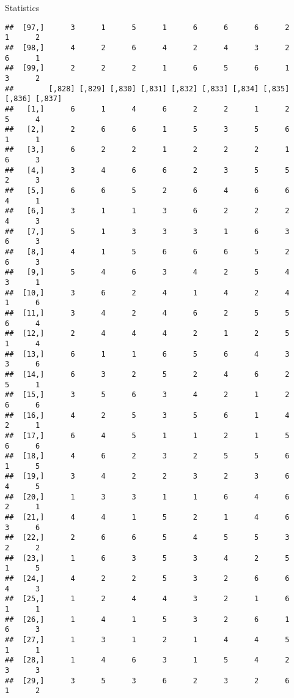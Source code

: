 \documentclass[
  ignorenonframetext,
]{beamer}
\begin{document}
\begin{frame}[fragile]{Statistics}
\begin{verbatim}
##  [97,]      3      1      5      1      6      6      6      2      1      2
##  [98,]      4      2      6      4      2      4      3      2      6      1
##  [99,]      2      2      2      1      6      5      6      1      3      2
##        [,828] [,829] [,830] [,831] [,832] [,833] [,834] [,835] [,836] [,837]
##   [1,]      6      1      4      6      2      2      1      2      5      4
##   [2,]      2      6      6      1      5      3      5      6      1      1
##   [3,]      6      2      2      1      2      2      2      1      6      3
##   [4,]      3      4      6      6      2      3      5      5      2      3
##   [5,]      6      6      5      2      6      4      6      6      4      1
##   [6,]      3      1      1      3      6      2      2      2      4      3
##   [7,]      5      1      3      3      3      1      6      3      6      3
##   [8,]      4      1      5      6      6      6      5      2      6      3
##   [9,]      5      4      6      3      4      2      5      4      3      1
##  [10,]      3      6      2      4      1      4      2      4      1      6
##  [11,]      3      4      2      4      6      2      5      5      6      4
##  [12,]      2      4      4      4      2      1      2      5      1      4
##  [13,]      6      1      1      6      5      6      4      3      3      6
##  [14,]      6      3      2      5      2      4      6      2      5      1
##  [15,]      3      5      6      3      4      2      1      2      6      6
##  [16,]      4      2      5      3      5      6      1      4      2      1
##  [17,]      6      4      5      1      1      2      1      5      6      6
##  [18,]      4      6      2      3      2      5      5      6      1      5
##  [19,]      3      4      2      2      3      2      3      6      4      5
##  [20,]      1      3      3      1      1      6      4      6      2      1
##  [21,]      4      4      1      5      2      1      4      6      3      6
##  [22,]      2      6      6      5      4      5      5      3      2      2
##  [23,]      1      6      3      5      3      4      2      5      1      5
##  [24,]      4      2      2      5      3      2      6      6      4      3
##  [25,]      1      2      4      4      3      2      1      6      1      1
##  [26,]      1      4      1      5      3      2      6      1      6      3
##  [27,]      1      3      1      2      1      4      4      5      1      1
##  [28,]      1      4      6      3      1      5      4      2      3      3
##  [29,]      3      5      3      6      2      3      2      6      1      2

\end{verbatim}
\end{frame}
\end{document}

